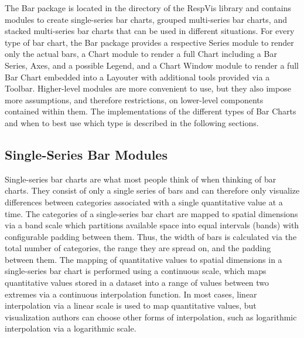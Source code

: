 The Bar package is located in the  directory of
the RespVis library and contains modules to create single-series bar
charts, grouped multi-series bar charts, and stacked multi-series bar
charts that can be used in different situations. For every type of bar
chart, the Bar package provides a respective Series module to render
only the actual bars, a Chart module to render a full Chart including
a Bar Series, Axes, and a possible Legend, and a Chart Window module
to render a full Bar Chart embedded into a Layouter with additional
tools provided via a Toolbar. Higher-level modules are more convenient
to use, but they also impose more assumptions, and therefore
restrictions, on lower-level components contained within them. The
implementations of the different types of Bar Charts and when to best
use which type is described in the following sections.





\subsection{Single-Series Bar Modules}

Single-series bar charts are what most people think of when thinking
of bar charts. They consist of only a single series of bars and can
therefore only visualize differences between categories associated
with a single quantitative value at a time. The categories of a
single-series bar chart are mapped to spatial dimensions via a band
scale which partitions available space into equal intervals (bands)
with configurable padding between them. Thus, the width of bars is
calculated via the total number of categories, the range they are
spread on, and the padding between them. The mapping of quantitative
values to spatial dimensions in a single-series bar chart is performed
using a continuous scale, which maps quantitative values stored in a
dataset into a range of values between two extremes via a continuous
interpolation function. In most cases, linear interpolation via a
linear scale is used to map quantitative values, but visualization
authors can choose other forms of interpolation, such as logarithmic
interpolation via a logarithmic scale.

